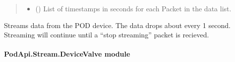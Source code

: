 \documentclass[letterpaper,10pt,english]{sphinxmanual}
\begin{document}
\begin{fulllineitems}
\begin{fulllineitems}
\begin{quote}
\begin{description}
\begin{itemize}
\item {} 
\sphinxAtStartPar
{} (\sphinxstyleliteralemphasis{\sphinxupquote{{[}}}\sphinxstyleliteralemphasis{\sphinxupquote{{]}}}) \textendash{} List of timestamps in seconds for each Packet                 in the data list.

\end{itemize}

\end{description}\end{quote}

\end{fulllineitems}


\begin{fulllineitems}
\label{\detokenize{PodApi.Stream:PodApi.Stream.DataHose.Hose._Flow}}
\pysigstartsignatures
{}
\pysigstopsignatures
\sphinxAtStartPar
Streams data from the POD device. The data drops about every 1 second.         Streaming will continue until a “stop streaming” packet is recieved.

\end{fulllineitems}


\end{fulllineitems}



\paragraph{PodApi.Stream.DeviceValve module}
\label{\detokenize{PodApi.Stream:module-PodApi.Stream.DeviceValve}}\label{\detokenize{PodApi.Stream:podapi-stream-devicevalve-module}}
\end{document}
